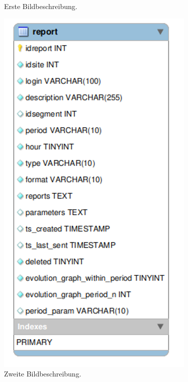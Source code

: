 \begin{figure}[h]
\begin{minipage}{0.48\textwidth}
        \captionsetup{skip=5pt}
        \caption{Erste Bildbeschreibung.}
        \label{fig:site}
    \end{minipage}
    \hfill
    \begin{minipage}{0.48\textwidth}
        \centering
        \includegraphics[width=\textwidth]{images/report.png}
        \captionsetup{skip=-1pt}
        \caption{Zweite Bildbeschreibung.}
        \label{fig:report}
    \end{minipage}
\end{figure}


